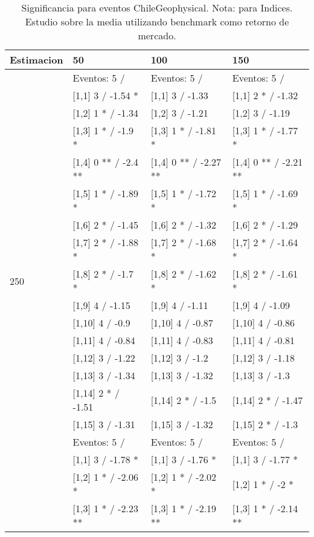 \begin{table}

\caption{Significancia para eventos ChileGeophysical. Nota: para Indices. Estudio sobre la media utilizando benchmark como retorno de mercado.}
\centering
\begin{tabular}[t]{llll}
\toprule
Estimacion & 50 & 100 & 150\\
\midrule
 & Eventos:  5 / & Eventos:  5 / & Eventos:  5 /\\
 & {}[1,1] 3  / -1.54 * & {}[1,1] 3  / -1.33 & {}[1,1] 2 * / -1.32\\
 & {}[1,2] 1 * / -1.34 & {}[1,2] 3  / -1.21 & {}[1,2] 3  / -1.19\\
 & {}[1,3] 1 * / -1.9 * & {}[1,3] 1 * / -1.81 * & {}[1,3] 1 * / -1.77 *\\
 & {}[1,4] 0 ** / -2.4 ** & {}[1,4] 0 ** / -2.27 ** & {}[1,4] 0 ** / -2.21 **\\
\addlinespace
 & {}[1,5] 1 * / -1.89 * & {}[1,5] 1 * / -1.72 * & {}[1,5] 1 * / -1.69 *\\
 & {}[1,6] 2 * / -1.45 & {}[1,6] 2 * / -1.32 & {}[1,6] 2 * / -1.29\\
 & {}[1,7] 2 * / -1.88 * & {}[1,7] 2 * / -1.68 * & {}[1,7] 2 * / -1.64 *\\
250 & {}[1,8] 2 * / -1.7 * & {}[1,8] 2 * / -1.62 * & {}[1,8] 2 * / -1.61 *\\
 & {}[1,9] 4  / -1.15 & {}[1,9] 4  / -1.11 & {}[1,9] 4  / -1.09\\
\addlinespace
 & {}[1,10] 4  / -0.9 & {}[1,10] 4  / -0.87 & {}[1,10] 4  / -0.86\\
 & {}[1,11] 4  / -0.84 & {}[1,11] 4  / -0.83 & {}[1,11] 4  / -0.81\\
 & {}[1,12] 3  / -1.22 & {}[1,12] 3  / -1.2 & {}[1,12] 3  / -1.18\\
 & {}[1,13] 3  / -1.34 & {}[1,13] 3  / -1.32 & {}[1,13] 3  / -1.3\\
 & {}[1,14] 2 * / -1.51 & {}[1,14] 2 * / -1.5 & {}[1,14] 2 * / -1.47\\
\addlinespace
 & {}[1,15] 3  / -1.31 & {}[1,15] 3  / -1.32 & {}[1,15] 2 * / -1.3\\
 & Eventos:  5 / & Eventos:  5 / & Eventos:  5 /\\
 & {}[1,1] 3  / -1.78 * & {}[1,1] 3  / -1.76 * & {}[1,1] 3  / -1.77 *\\
 & {}[1,2] 1 * / -2.06 * & {}[1,2] 1 * / -2.02 * & {}[1,2] 1 * / -2 *\\
 & {}[1,3] 1 * / -2.23 ** & {}[1,3] 1 * / -2.19 ** & {}[1,3] 1 * / -2.14 **\\

\end{tabular}
\end{table}
